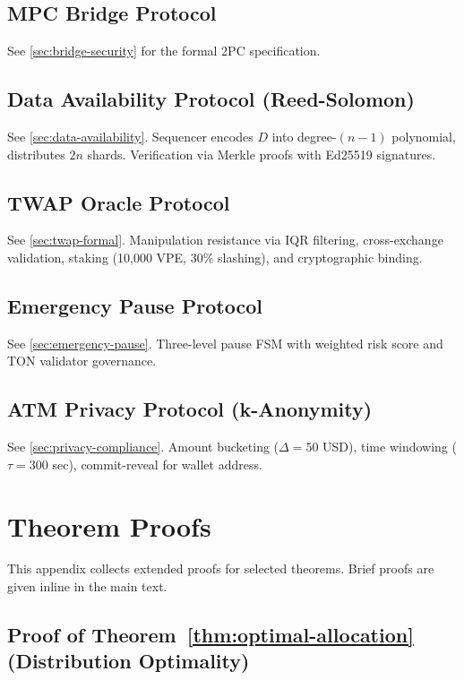 \documentclass[12pt,a4paper]{article}
\theoremstyle{definition}
\theoremstyle{remark}
\begin{document}
\subsection{MPC Bridge Protocol}

See \cref{sec:bridge-security} for the formal 2PC specification.

\subsection{Data Availability Protocol (Reed-Solomon)}

See \cref{sec:data-availability}. Sequencer encodes $D$ into degree-$(n-1)$ polynomial, distributes $2n$ shards. Verification via Merkle proofs with Ed25519 signatures.

\subsection{TWAP Oracle Protocol}

See \cref{sec:twap-formal}. Manipulation resistance via IQR filtering, cross-exchange validation, staking (10,000 VPE, 30\% slashing), and cryptographic binding.

\subsection{Emergency Pause Protocol}

See \cref{sec:emergency-pause}. Three-level pause FSM with weighted risk score and TON validator governance.

\subsection{ATM Privacy Protocol (k-Anonymity)}

See \cref{sec:privacy-compliance}. Amount bucketing ($\Delta = 50$ USD), time windowing ($\tau = 300$ sec), commit-reveal for wallet address.


\section{Theorem Proofs}
\label{app:proofs}

This appendix collects extended proofs for selected theorems. Brief proofs are given inline in the main text.

\subsection{Proof of Theorem~\ref{thm:optimal-allocation} (Distribution Optimality)}
\end{document}
